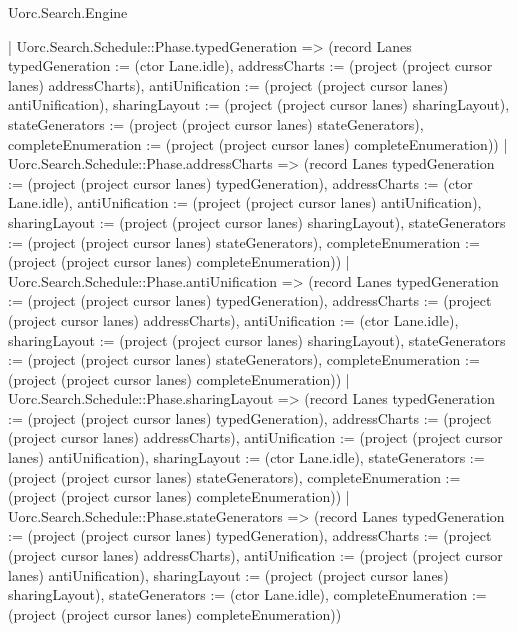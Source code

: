 \begin{lexlean}{Uorc.Search.Engine}
\begin{semanticmodule}
{{            | Uorc.Search.Schedule::Phase.typedGeneration => (record Lanes {typedGeneration := (ctor Lane.idle), addressCharts := (project (project cursor lanes) addressCharts), antiUnification := (project (project cursor lanes) antiUnification), sharingLayout := (project (project cursor lanes) sharingLayout), stateGenerators := (project (project cursor lanes) stateGenerators), completeEnumeration := (project (project cursor lanes) completeEnumeration)})
            | Uorc.Search.Schedule::Phase.addressCharts => (record Lanes {typedGeneration := (project (project cursor lanes) typedGeneration), addressCharts := (ctor Lane.idle), antiUnification := (project (project cursor lanes) antiUnification), sharingLayout := (project (project cursor lanes) sharingLayout), stateGenerators := (project (project cursor lanes) stateGenerators), completeEnumeration := (project (project cursor lanes) completeEnumeration)})
            | Uorc.Search.Schedule::Phase.antiUnification => (record Lanes {typedGeneration := (project (project cursor lanes) typedGeneration), addressCharts := (project (project cursor lanes) addressCharts), antiUnification := (ctor Lane.idle), sharingLayout := (project (project cursor lanes) sharingLayout), stateGenerators := (project (project cursor lanes) stateGenerators), completeEnumeration := (project (project cursor lanes) completeEnumeration)})
            | Uorc.Search.Schedule::Phase.sharingLayout => (record Lanes {typedGeneration := (project (project cursor lanes) typedGeneration), addressCharts := (project (project cursor lanes) addressCharts), antiUnification := (project (project cursor lanes) antiUnification), sharingLayout := (ctor Lane.idle), stateGenerators := (project (project cursor lanes) stateGenerators), completeEnumeration := (project (project cursor lanes) completeEnumeration)})
            | Uorc.Search.Schedule::Phase.stateGenerators => (record Lanes {typedGeneration := (project (project cursor lanes) typedGeneration), addressCharts := (project (project cursor lanes) addressCharts), antiUnification := (project (project cursor lanes) antiUnification), sharingLayout := (project (project cursor lanes) sharingLayout), stateGenerators := (ctor Lane.idle), completeEnumeration := (project (project cursor lanes) completeEnumeration)})
}}
\end{semanticmodule}
\end{lexlean}

